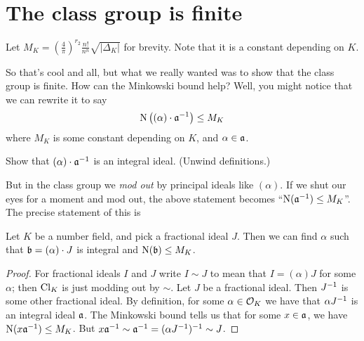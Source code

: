 \section{The class group is finite}
\begin{definition}
	Let
	$M_K = \left( \frac 4\pi \right)^{r_2} \frac{n!}{n^n} \sqrt{\left\lvert \Delta_K \right\rvert}$
	for brevity.
	Note that it is a constant depending on $K$.
\end{definition}
So that's cool and all, but what we really wanted was to show that
the class group is finite.
How can the Minkowski bound help?
Well, you might notice that we can rewrite it to say
\[ \operatorname{N}\left( (\alpha) \cdot \mathfrak a^{-1} \right) \le M_K \]
where $M_K$ is some constant depending on $K$, and $\alpha \in \mathfrak a$.
\begin{ques}
	Show that $(\alpha) \cdot \mathfrak a^{-1}$ is an integral ideal.
	(Unwind definitions.)
\end{ques}
But in the class group we \emph{mod out} by principal ideals like $(\alpha)$.
If we shut our eyes for a moment and mod out, the above statement becomes ``$\operatorname{N}(\mathfrak a^{-1})\le M_K$''.
The precise statement of this is
\begin{corollary}
	\label{cor:class_rep_minkowski}
	Let $K$ be a number field, and pick a fractional ideal $J$.
	Then we can find $\alpha$ such that $\mathfrak b = (\alpha) \cdot J$ is integral
	and $\operatorname{N}(\mathfrak b) \le M_K$.
\end{corollary}
\begin{proof}
	For fractional ideals $I$ and $J$ write $I \sim J$ to mean
	that $I = (\alpha)J$ for some $\alpha$; then $\mathrm{Cl}_K$ is just modding out by $\sim$.
	Let $J$ be a fractional ideal.
	Then $J^{-1}$ is some other fractional ideal.
	By definition, for some $\alpha \in \mathcal O_K$ we have that $\alpha J^{-1}$ is an integral ideal $\mathfrak a$.
	The Minkowski bound tells us that for some $x \in \mathfrak a$, we have $\operatorname{N}(x\mathfrak a^{-1}) \le M_K$.
	But $x\mathfrak a^{-1} \sim \mathfrak a^{-1} = (\alpha J^{-1})^{-1} \sim J$.
\end{proof}

